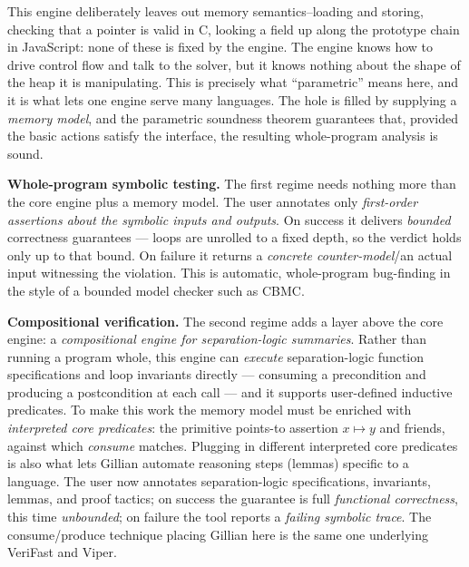 \documentclass[11pt]{article}
\begin{document}
This engine deliberately leaves out memory semantics--loading and storing, checking that a pointer is valid in C, looking a field up along the prototype chain in JavaScript: none of these is fixed by the engine.
The engine knows how to drive control flow and talk to the solver, but it knows nothing about the shape of the heap it is manipulating. This is precisely what ``parametric'' means here, and it is what lets one engine serve many languages.
The hole is filled by supplying a \emph{memory model}, and the parametric soundness theorem guarantees that, provided the basic actions satisfy the interface, the resulting whole-program analysis is sound.

\textbf{Whole-program symbolic testing.} The first regime needs nothing more than the core engine plus a memory model.
The user annotates only \emph{first-order assertions about the symbolic inputs and outputs}.
On success it delivers \emph{bounded} correctness guarantees --- loops are unrolled to a fixed depth, so the verdict holds only up to that bound.
On failure it returns a \emph{concrete counter-model}/an actual input witnessing the violation.
This is automatic, whole-program bug-finding in the style of a bounded model checker such as CBMC.

\textbf{Compositional verification.}
The second regime adds a layer above the core engine: a \emph{compositional engine for separation-logic summaries}.
Rather than running a program whole, this engine can \emph{execute} separation-logic function specifications and loop invariants directly --- consuming a precondition and producing a postcondition at each call --- and it supports user-defined inductive predicates.
To make this work the memory model must be enriched with \emph{interpreted core predicates}: the primitive points-to assertion $x \mapsto y$ and friends, against which \emph{consume} matches.
Plugging in different interpreted core predicates is also what lets Gillian automate reasoning steps (lemmas) specific to a language.
The user now annotates separation-logic specifications, invariants, lemmas, and proof tactics; on success the guarantee is full \emph{functional correctness}, this time \emph{unbounded}; on failure the tool reports a \emph{failing symbolic trace}.
The consume/produce technique placing Gillian here is the same one underlying VeriFast and Viper.
\end{document}
